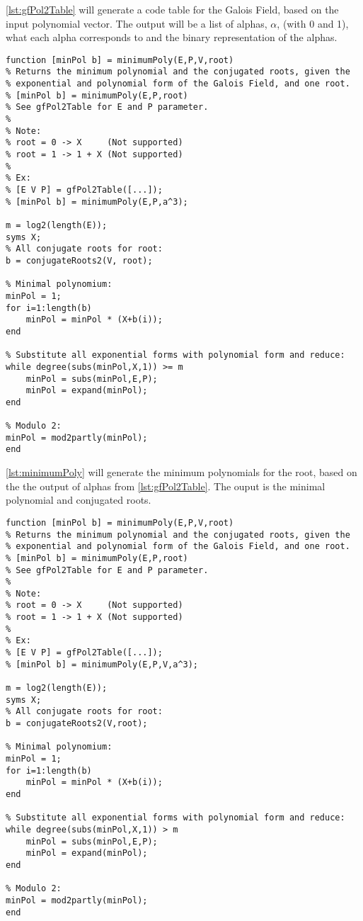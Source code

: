 \documentclass[Main]{subfiles}
\begin{document}
\codeTitle \ref{lst:gfPol2Table} will generate a code table for the Galois Field, based on the input polynomial vector.
The output will be a list of alphas, $\alpha$, (with 0 and 1), what each alpha corresponds to and the binary representation of the alphas.
\begin{lstlisting}[caption=gfPol2Table, style=Code-Matlab, label=lst:gfPol2Table]
function [minPol b] = minimumPoly(E,P,V,root)
% Returns the minimum polynomial and the conjugated roots, given the
% exponential and polynomial form of the Galois Field, and one root.
% [minPol b] = minimumPoly(E,P,root)
% See gfPol2Table for E and P parameter.
%
% Note: 
% root = 0 -> X     (Not supported)
% root = 1 -> 1 + X (Not supported)
%
% Ex: 
% [E V P] = gfPol2Table([...]);
% [minPol b] = minimumPoly(E,P,a^3);

m = log2(length(E));
syms X;
% All conjugate roots for root:
b = conjugateRoots2(V, root);

% Minimal polynomium:
minPol = 1;
for i=1:length(b)
    minPol = minPol * (X+b(i));
end
 
% Substitute all exponential forms with polynomial form and reduce:
while degree(subs(minPol,X,1)) >= m
    minPol = subs(minPol,E,P);
    minPol = expand(minPol);
end

% Modulo 2:
minPol = mod2partly(minPol);
end
\end{lstlisting}



\codeTitle \ref{lst:minimumPoly} will generate the minimum polynomials for the root, based on the the output of alphas from \codeTitle \ref{lst:gfPol2Table}.
The ouput is the minimal polynomial and conjugated roots.

\begin{lstlisting}[caption=MinimumPoly, style=Code-Matlab, label=lst:minimumPoly]
function [minPol b] = minimumPoly(E,P,V,root)
% Returns the minimum polynomial and the conjugated roots, given the
% exponential and polynomial form of the Galois Field, and one root.
% [minPol b] = minimumPoly(E,P,root)
% See gfPol2Table for E and P parameter.
%
% Note: 
% root = 0 -> X     (Not supported)
% root = 1 -> 1 + X (Not supported)
%
% Ex: 
% [E V P] = gfPol2Table([...]);
% [minPol b] = minimumPoly(E,P,V,a^3);

m = log2(length(E));
syms X;
% All conjugate roots for root:
b = conjugateRoots2(V,root);

% Minimal polynomium:
minPol = 1;
for i=1:length(b)
    minPol = minPol * (X+b(i));
end
 
% Substitute all exponential forms with polynomial form and reduce:
while degree(subs(minPol,X,1)) > m
    minPol = subs(minPol,E,P);
    minPol = expand(minPol);
end

% Modulo 2:
minPol = mod2partly(minPol);
end
\end{lstlisting}
\end{document}
